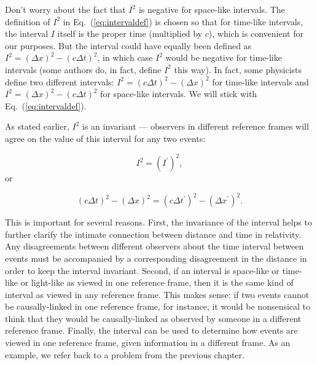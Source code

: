 Don't worry about the fact that $I^2$ is negative for space-like
intervals.  The definition of $I^2$ in Eq.~(\ref{eq:intervaldef}) is
chosen so that for time-like intervals, the interval $I$ itself is the
proper time (multiplied by $c$), which is convenient for our purposes.  
But the interval could have equally been defined as 
$I^2 = \left(\Delta x\right)^2 - \left(c \Delta t\right)^2$, 
in which case $I^2$ would be negative for
time-like intervals (some authors do, in fact, define $I^2$ this way).
In fact, some physicists define two different intervals: $I^2 =
\left(c\Delta t\right)^2-\left(\Delta x\right)^2$ for time-like
intervals and $I^2 = \left(\Delta x\right)^2-\left(c\Delta t\right)^2$
for space-like intervals.  We will stick with Eq.~(\ref{eq:intervaldef}).

As stated earlier, $I^2$ is an invariant --- observers in different
reference frames will agree on the value of this interval for any two
events:
    
\begin{equation}
I^2 = \left(I^\prime\right)^2,
\end{equation}
or

\begin{boxiteq}{
\begin{equation}
\left(c\Delta t\right)^2 - \left(\Delta x\right)^2 = 
              \left(c\Delta t^\prime\right)^2 - 
     \left(\Delta x^\prime\right)^2.
\label{eq:interval-invariance}
\end{equation}
}
\end{boxiteq}

\noindent This is important for several reasons.  First, the
invariance of the interval helps to further clarify the intimate
connection between distance and time in relativity.  Any disagreements
between different observers about the time interval between events
must be accompanied by a corresponding disagreement in the distance in
order to keep the interval invariant.  Second, if an interval is
space-like or time-like or light-like as viewed in one reference
frame, then it is the same kind of interval as viewed in any reference
frame.  This makes sense: if two events cannot be causally-linked in
one reference frame, for instance, it would be nonsensical to think
that they would be causally-linked as observed by someone in a
different reference frame.  Finally, the interval can be used to
determine how events are viewed in one reference frame, given
information in a different frame.  As an example, we refer back to a
problem from the previous chapter.


